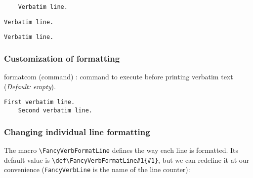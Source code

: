 \documentclass[twoside]{article}
\makeatletter
\newcommand\cs[1]{\texttt{\textbackslash#1}}
\providecommand\optname[1]{\textsf{#1}}
\newenvironment{optlist}{\begin{description}%
  \renewcommand\makelabel[1]{%
    \descriptionlabel{\mdseries\optname{##1}}}%
  \itemsep0.25\itemsep}%
 {\end{description}}
\def\thinskip{\hskip 0.16667em\relax}
\def\endash{--}
\def\emdash{\endash-}
\def\d@sh#1#2{\unskip#1\thinskip#2\thinskip\ignorespaces}
\def\Dash{\d@sh\nobreak\emdash}
\makeatother
\begin{document}

\begin{SideBySideExample}
  \begin{Verbatim}
    Verbatim line.
  \end{Verbatim}

  \begin{Verbatim}[gobble=2]
    Verbatim line.
  \end{Verbatim}

  \begin{Verbatim}[gobble=8]
    Verbatim line.
  \end{Verbatim}
\end{SideBySideExample}

\subsubsection{Customization of formatting}

\begin{optlist}
  \item[formatcom (command)]: command to execute before printing verbatim
  text
  (\emph{Default: empty}).
\end{optlist}

\begin{SideBySideExample}
  \begin{Verbatim}[formatcom=\color{red}]
    First verbatim line.
    Second verbatim line.
  \end{Verbatim}
\end{SideBySideExample}

\subsubsection{Changing individual line formatting}

  The macro \cs{FancyVerbFormatLine} defines the way each line is formatted.
Its default value is \verb+\def\FancyVerbFormatLine#1{#1}+, but we can
redefine it at our convenience (\texttt{FancyVerbLine} is the name of the
line counter):
\end{document}
